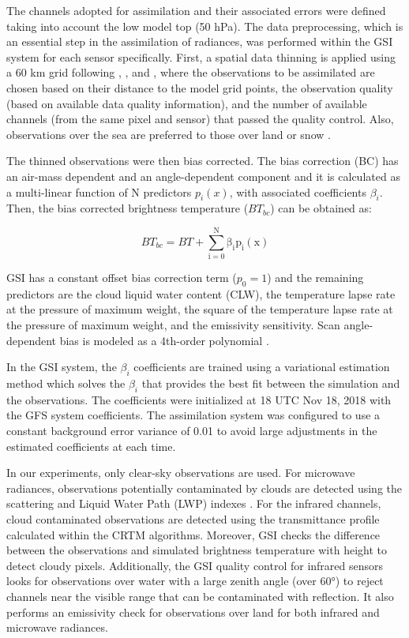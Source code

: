 \documentclass[preprint, 3p, authoryear,review, 12pt]{elsarticle} %
\begin{document}
The channels adopted for assimilation and their associated errors were defined taking into account the low model top (50 hPa). The data preprocessing, which is an essential step in the assimilation of radiances, was performed within the GSI system for each sensor specifically. First, a spatial data thinning is applied using a 60 km grid following \citet{singh2016}, \citet{jones2013}, and \citet{lin2017a}, where the observations to be assimilated are chosen based on their distance to the model grid points, the observation quality (based on available data quality information), and the number of available channels (from the same pixel and sensor) that passed the quality control. Also, observations over the sea are preferred to those over land or snow \citep{hu2018}.

The thinned observations were then bias corrected. The bias correction (BC) has an air-mass dependent and an angle-dependent component \citep{zhu2014} and it is calculated as a multi-linear function of N predictors \(p_i(x)\), with associated coefficients \(\beta_i\). Then, the bias corrected brightness temperature (\(BT_{bc}\)) can be obtained as:

\begin{equation}
  \mathrm{\mathit{BT_{bc}} =\mathit{ BT} + \sum_{i = 0}^{N} \beta_i p_i (x)}
  \label{eq:eq1}
\end{equation}

GSI has a constant offset bias correction term (\(p_0 = 1\)) and the remaining predictors are the cloud liquid water content (CLW), the temperature lapse rate at the pressure of maximum weight, the square of the temperature lapse rate at the pressure of maximum weight, and the emissivity sensitivity. Scan angle-dependent bias is modeled as a 4th-order polynomial \citep{zhu2014}.

In the GSI system, the \(\beta_i\) coefficients are trained using a variational estimation method which solves the \(\beta_i\) that provides the best fit between the simulation and the observations. The coefficients were initialized at 18 UTC Nov 18, 2018 with the GFS system coefficients. The assimilation system was configured to use a constant background error variance of 0.01 to avoid large adjustments in the estimated coefficients at each time.

In our experiments, only clear-sky observations are used. For microwave radiances, observations potentially contaminated by clouds are detected using the scattering and Liquid Water Path (LWP) indexes \citep{weston2019, zhu2016}. For the infrared channels, cloud contaminated observations are detected using the transmittance profile calculated within the CRTM algorithms. Moreover, GSI checks the difference between the observations and simulated brightness temperature with height to detect cloudy pixels. Additionally, the GSI quality control for infrared sensors looks for observations over water with a large zenith angle (over 60°) to reject channels near the visible range that can be contaminated with reflection. It also performs an emissivity check for observations over land for both infrared and microwave radiances.
\end{document}
